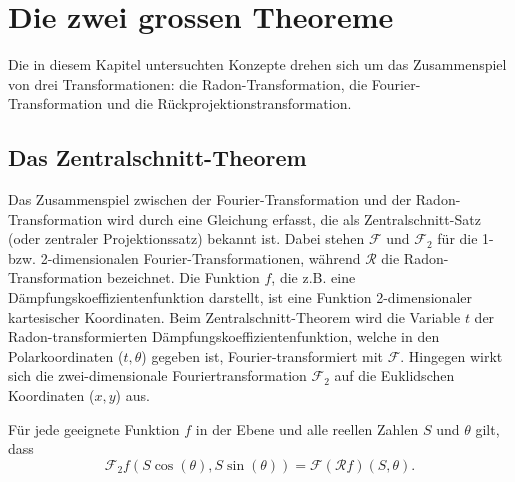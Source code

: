 %
%
%
%
\section{Die zwei grossen Theoreme
	\label{ct:section:theoreme}}
Die in diesem Kapitel untersuchten Konzepte drehen sich um das Zusammenspiel von drei Transformationen: die Radon-Transformation, die Fourier-Transformation und die Rückprojektionstransformation.

\subsection{Das Zentralschnitt-Theorem
	\label{ct:subsection:zentralschnitt}}
Das Zusammenspiel zwischen der Fourier-Transformation und der Radon-Transformation wird durch eine Gleichung erfasst, die als Zentralschnitt-Satz (oder zentraler Projektionssatz) bekannt ist. Dabei stehen $\mathscr{F}$ und $\mathscr{F}_2$ für die 1- bzw. 2-dimensionalen Fourier-Transformationen, während $\mathscr{R}$ die Radon-Transformation bezeichnet. Die Funktion $f$, die z.B. eine Dämpfungskoeffizientenfunktion darstellt, ist eine Funktion 2-dimensionaler kartesischer Koordinaten.
Beim Zentralschnitt-Theorem wird die Variable $t$ der Radon-transformierten Dämpfungskoeffizientenfunktion, welche in den Polarkoordinaten ($t, \theta$) gegeben ist, Fourier-transformiert mit $\mathscr{F}$. 
Hingegen wirkt sich die zwei-dimensionale Fouriertransformation  $\mathscr{F}_2$ auf die Euklidschen Koordinaten ($x, y$) aus.

\begin{satz}
Für jede geeignete Funktion $f$ in der Ebene und alle reellen Zahlen $S$ und $\theta$ gilt, dass
	\begin{equation}\label{2dFourier1}
		\mathscr{F}_2f(S\cos(\theta), S\sin(\theta)) = \mathscr{F}(\mathscr{R}f)(S, \theta).
	\end{equation}
\end{satz}

